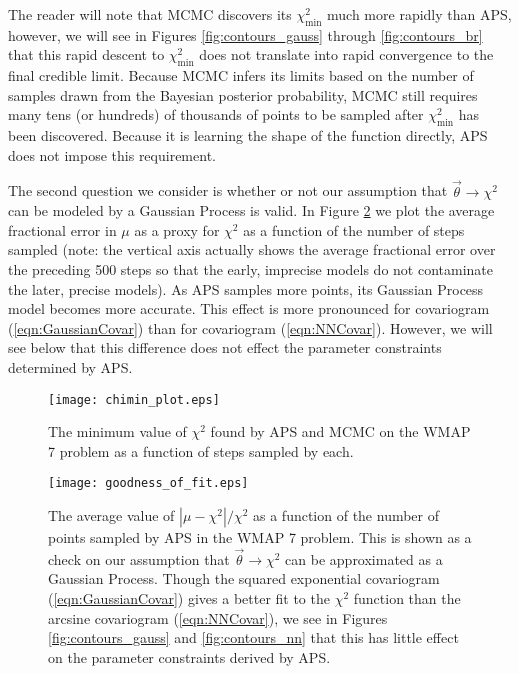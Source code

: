 \documentclass[useAMS,usenatbib]{aastex}
\begin{document}
The reader will note that
MCMC discovers its $\chi^2_\text{min}$ much more rapidly than APS, however, 
we will see
in Figures \ref{fig:contours_gauss} through \ref{fig:contours_br} that this rapid
descent to $\chi^2_\text{min}$ does not translate into rapid convergence to
the final credible limit.  Because MCMC infers its limits based on the number
of samples drawn from the Bayesian posterior probability, MCMC still requires
many tens (or hundreds) of thousands of points to be sampled after $\chi^2_\text{min}$
has been discovered.  Because it is learning the shape of the function
directly, APS does not impose this requirement.

The second question we consider is whether or not our assumption that
$\vec{\theta}\rightarrow\chi^2$ can be modeled by a Gaussian Process is 
valid.  In Figure
\ref{fig:goodness} we plot the average fractional error in $\mu$ as a proxy for $\chi^2$ as a
function of the number of steps sampled (note: the vertical axis actually shows the average
fractional error over the preceding 500 steps so that the early, imprecise models do not
contaminate the later, precise models).  As APS samples more points, its Gaussian Process
model becomes more accurate.  This effect is more pronounced for covariogram (\ref{eqn:GaussianCovar})
than for covariogram (\ref{eqn:NNCovar}).  However, we will see below that this difference
does not effect the parameter constraints determined by APS.

\begin{figure}
\texttt{[image: chimin\_plot.eps]}
\caption{
The minimum value of $\chi^2$ found by APS and MCMC on the WMAP 7 problem
as a function of 
steps sampled by each.
}
\label{fig:chimin}
\end{figure}

\begin{figure}
\texttt{[image: goodness\_of\_fit.eps]}
\caption{
The average value of $|\mu-\chi^2|/\chi^2$ as a function of the number of points
sampled by APS in the WMAP 7 problem.  
This is shown as a check on our assumption that
$\vec{\theta}\rightarrow\chi^2$ can be approximated as a Gaussian Process.
Though the squared exponential covariogram (\ref{eqn:GaussianCovar})
gives a better fit to the $\chi^2$ function than the arcsine covariogram
(\ref{eqn:NNCovar}),
we see in Figures \ref{fig:contours_gauss} and \ref{fig:contours_nn}
that this has little effect on the parameter constraints derived by APS.
}
\label{fig:goodness}
\end{figure}
\end{document}
